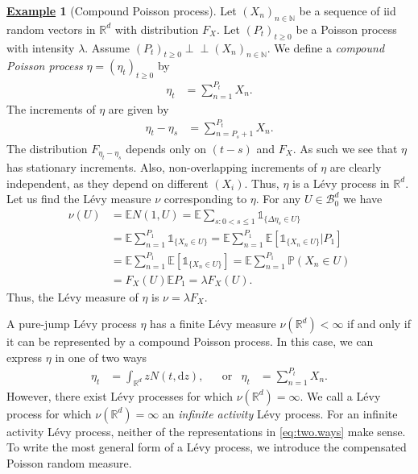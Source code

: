\documentclass[12pt]{book}
\numberwithin{equation}{chapter}
\theoremstyle{plain}
\numberwithin{theorem}{section}
\theoremstyle{definition}
\newtheorem{example}[theorem]{\underline{Example}}
\numberwithin{exercise}{chapter}
\newcommand{\<}{\langle}
\renewcommand{\>}{\rangle}
\renewcommand{\(}{\left(}
\renewcommand{\)}{\right)}
\renewcommand{\[}{\left[}
\renewcommand{\]}{\right]}
\newcommand\Eb{\mathds{E}}
\newcommand\Ib{\mathds{1}} 	%
\newcommand\Pb{\mathds{P}}
\newcommand\Rb{\mathds{R}}
\newcommand\Nb{\mathds{N}}
\newcommand\Bc{\mathscr{B}}
\newcommand\lam{\lambda}
\newcommand\Del{\Delta}
\newcommand{\ind}{\perp \! \! \! \perp}
\newcommand\dd{\mathrm{d}}
\begin{document}
\begin{example}[Compound Poisson process]
Let $(X_n)_{n \in \Nb}$ be a sequence of iid random vectors in $\Rb^d$ with distribution $F_X$.  Let $(P_t)_{t \geq 0}$ be a Poisson process with intensity $\lam$. Assume $(P_t)_{t \geq 0} \ind (X_n)_{n \in \Nb}$.  We define a \emph{compound Poisson process} $\eta = (\eta_t)_{t \geq 0}$ by
\begin{align}
\eta_t
	&=	\sum_{n=1}^{P_t} X_n .
\end{align}
The increments of $\eta$ are given by
\begin{align}
\eta_t - \eta_s
	&=	\sum_{n = P_s + 1}^{P_t} X_n .
\end{align}
The distribution $F_{\eta_t - \eta_s}$ depends only on $(t-s)$ and $F_X$.  As such we see that $\eta$ has stationary increments.  Also, non-overlapping increments of $\eta$ are clearly independent, as they depend on different $(X_i)$.  Thus, $\eta$ is a L\'evy process in $\Rb^d$.  Let us find the L\'evy measure $\nu$ corresponding to $\eta$.  For any $U \in \Bc_0^d$ we have
\begin{align}
\nu(U)
	&=	\Eb N(1,U)
	=		\Eb \sum_{s:0 < s \leq 1} \Ib_{\{ \Del \eta_s \in U \}} \\
	&=	\Eb \sum_{n=1}^{P_1} \Ib_{ \{X_n \in U \} } 
	=		\Eb \sum_{n=1}^{P_1} \Eb[ \Ib_{ \{X_n \in U \} } | P_1 ] \\
	&=	\Eb \sum_{n=1}^{P_1} \Eb[ \Ib_{ \{X_n \in U \} } ]
	=		\Eb \sum_{n=1}^{P_1} \Pb( X_n \in U ) \\
	&=	F_X(U) \Eb P_1
	=		\lam F_X(U) .
\end{align}
Thus, the L\'evy measure of $\eta$ is $\nu = \lam F_X$.
\end{example}

\noindent
A pure-jump L\'evy process $\eta$ has a finite L\'evy measure $\nu(\Rb^d) < \infty$ if and only if it can be represented by a compound Poisson process.  In this case, we can express $\eta$ in one of two ways
\begin{align}
\eta_t
	&=	\int_{\Rb^d} z N(t ,\dd z) , &
	&\text{or}&
\eta_t	
	&=	\sum_{n=1}^{P_t} X_n . \label{eq:two.ways}
\end{align}
However, there exist L\'evy processes  for which $\nu(\Rb^d) = \infty$.  We call a L\'evy process for which $\nu(\Rb^d) = \infty$ an \emph{infinite activity} L\'evy process.  For an infinite activity L\'evy process, neither of the representations in \eqref{eq:two.ways} make sense.  
To write the most general form of a L\'evy process, we introduce the compensated Poisson random measure.
\end{document}
